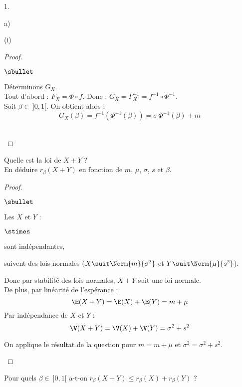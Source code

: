 \documentclass[11pt]{article}%
\begin{document}
\begin{noliste}{1.}
\begin{noliste}{a)}
\begin{nonoliste}{(i)}
\begin{proof}
\begin{noliste}{$\sbullet$}
	  
	  
	  
	  
	  
	  \item Déterminons $G_X$.\\
	  Tout d'abord : $F_X=\Phi \circ f$. Donc :
	  $G_X=F_X^{-1} = f^{-1} \circ \Phi^{-1}$.\\
	  Soit $\beta \in \ ]0,1[$. On obtient alors :
	  \[
	    G_X(\beta) = f^{-1}(\Phi^{-1}(\beta)) = \sigma \,
	    \Phi^{-1}(\beta) +m
	  \]
	  ~\\[-1.4cm]
        \end{noliste}
      \end{proof}
    \end{nonoliste}
    
    \item Quelle est la loi de $X+Y$ ?\\
    En déduire $r_\beta(X+Y)$ en fonction de $m$, $\mu$, $\sigma$, 
    $s$ et $\beta$.
    
    \begin{proof}~
      \begin{noliste}{$\sbullet$}
	\item Les \var $X$ et $Y$ :
	\begin{noliste}{$\stimes$}
	  \item sont indépendantes,
	  \item suivent des lois normales ($X \suit \Norm{m}{
	  \sigma^2}$ et $Y \suit \Norm{\mu}{s^2}$).
	\end{noliste}
	Donc par stabilité des lois normales, $X+Y$ suit une loi 
	normale.\\
	De plus, par linéarité de l'espérance :
	\[
	  \E(X+Y) = \E(X) + \E(Y) = m+\mu
	\]
	Par indépendance de $X$ et $Y$ :
	\[
	  \V(X+Y) = \V(X)+\V(Y) = \sigma^2+s^2
	\]
	
	\item On applique le résultat de la question 
	pour $m=m+\mu$ et $\sigma^2=\sigma^2+s^2$.
	~\\[-1.4cm]
      \end{noliste}
    \end{proof}

    
    \item Pour quels $\beta \in \ ]0,1[$ a-t-on $r_{\beta}(X+Y) \leq
    r_\beta(X)+r_\beta(Y)$ ?
    

\end{noliste}
\end{noliste}
\end{document}
